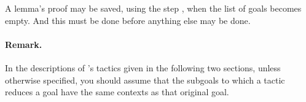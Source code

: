 A lemma's proof may be saved, using the step , when the list
of goals becomes empty. And this must be done before anything else may
be done.

\paragraph{Remark.}
In the descriptions of \EasyCrypt's tactics given in the following two
sections, unless otherwise specified, you should assume that the
subgoals to which a tactic reduces a goal have the same contexts as
that original goal.




